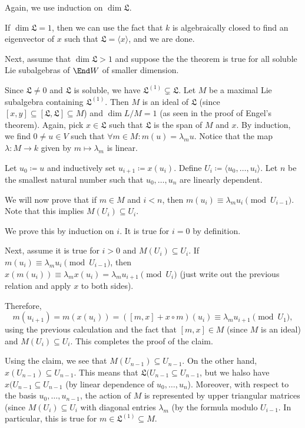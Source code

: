 Again, we use induction on $\dim \mathfrak{L}$.

If $\dim \mathfrak{L} = 1$, then we can use the fact that $k$ is algebraically
closed to find an eigenvector of $x$ such that $\mathfrak{L} = \langle x\rangle$,
and we are done.

Next, assume that $\dim \mathfrak{L} > 1$ and suppose the the theorem is true
for all soluble Lie subalgebras of $\End W$ of smaller dimension.

Since $\mathfrak{L} \neq 0$ and $\mathfrak{L} $ is soluble, we have
$\mathfrak{L}^{(1)}\subsetneq \mathfrak{L}$. Let $M$ be a maximal Lie
subalgebra containing $\mathfrak{L}^{(1)}$. Then $M$ is an ideal of $\mathfrak{L}$
(since $[x, y] \subseteq [\mathfrak{L}, \mathfrak{L}] \subseteq M$) and
$\dim L/M = 1$ (as seen in the proof of Engel's theorem). Again, pick $x \in \mathfrak{L}$
such that $\mathfrak{L}$ is the span of $M$ and $x$.
By induction, we find $0\neq u \in V$ such that
$\forall m \in M\colon m(u) = \lambda_mu$. Notice that the map
$\lambda\colon M\to k$ given by $m\mapsto \lambda_m$ is linear.

Let $u_0\coloneqq u$ and inductively set $u_{i+1}\coloneqq x(u_i)$. Define
$U_i\coloneqq \langle u_0, \ldots, u_i\rangle$. Let $n$ be the smallest natural
number such that  $u_0, \ldots, u_n$ are linearly dependent.

We will now prove that if $m \in M$ and $i < n$, then
$m(u_i) \equiv \lambda_mu_i\pmod{U_{i-1}}$.
Note that this implies $M(U_i) \subseteq U_i$.

We prove this by induction on $i$. It is true for $i = 0$ by definition.

Next, assume it is true for $i > 0$ and $M(U_i) \subseteq U_i$. If
$m(u_i) \equiv \lambda_mu_i\pmod{U_{i-1}}$,
then $x(m(u_i)) \equiv \lambda_m x(u_i) = \lambda_m u_{i+1} \pmod{U_i}$ (just write out the previous
relation and apply $x$ to both sides).

Therefore,
\[ m(u_{i+1}) = m(x(u_i)) = ([m, x] + x \circ m)(u_i) \equiv \lambda_mu_{i+1}\pmod{U_1}, \]
using the previous calculation and the fact that $[m, x] \in M$ (since $M$ is
an ideal) and $M(U_i) \subseteq U_i$. This completes the proof of the claim.

Using the claim, we see that $M(U_{n - 1}) \subseteq U_{n-1}$.  On the other hand,
$x(U_{n-1}) \subseteq U_{n-1}$. This means that $\mathfrak{L}(U_{n-1} \subseteq U_{n-1}$,
but we halso have $x(U_{n-1} \subseteq U_{n-1}$
(by linear dependence of $u_0, \ldots, u_n$). Moreover, with respect to the basis
$u_0, \ldots, u_{n-1}$, the action of $M$ is represented by upper triangular
matrices (since $M(U_i) \subseteq U_i$ with diagonal entries $\lambda_m$ (by the
formula modulo $U_{i-1}$. In particular, this is true for
$m \in \mathfrak{L}^{(1)} \subseteq M$.

